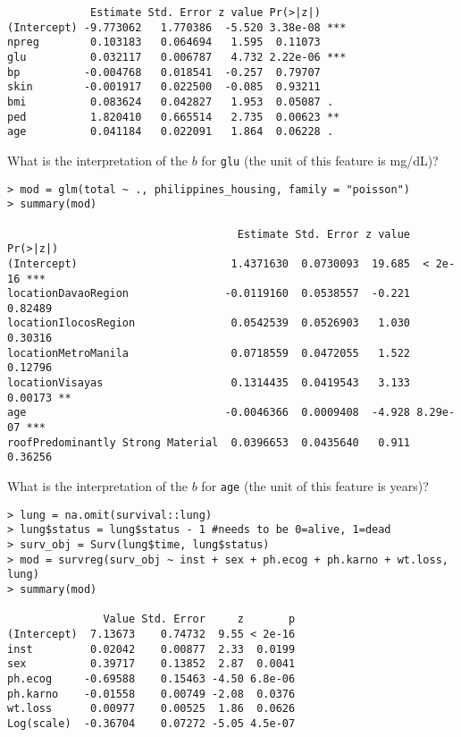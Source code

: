 \documentclass[12pt]{article}
\begin{document}
\begin{enumerate}
\begin{verbatim}
             Estimate Std. Error z value Pr(>|z|)    
(Intercept) -9.773062   1.770386  -5.520 3.38e-08 ***
npreg        0.103183   0.064694   1.595  0.11073    
glu          0.032117   0.006787   4.732 2.22e-06 ***
bp          -0.004768   0.018541  -0.257  0.79707    
skin        -0.001917   0.022500  -0.085  0.93211    
bmi          0.083624   0.042827   1.953  0.05087 .  
ped          1.820410   0.665514   2.735  0.00623 ** 
age          0.041184   0.022091   1.864  0.06228 .  
\end{verbatim}

What is the interpretation of the $b$ for \texttt{glu} (the unit of this feature is mg/dL)?



\vspace{-0.2cm}
\begin{verbatim}
> mod = glm(total ~ ., philippines_housing, family = "poisson")
> summary(mod)

                                    Estimate Std. Error z value Pr(>|z|)    
(Intercept)                        1.4371630  0.0730093  19.685  < 2e-16 ***
locationDavaoRegion               -0.0119160  0.0538557  -0.221  0.82489    
locationIlocosRegion               0.0542539  0.0526903   1.030  0.30316    
locationMetroManila                0.0718559  0.0472055   1.522  0.12796    
locationVisayas                    0.1314435  0.0419543   3.133  0.00173 ** 
age                               -0.0046366  0.0009408  -4.928 8.29e-07 ***
roofPredominantly Strong Material  0.0396653  0.0435640   0.911  0.36256     
\end{verbatim}

What is the interpretation of the $b$ for \texttt{age} (the unit of this feature is years)?



\vspace{-0.2cm}
\begin{verbatim}
> lung = na.omit(survival::lung)
> lung$status = lung$status - 1 #needs to be 0=alive, 1=dead
> surv_obj = Surv(lung$time, lung$status)
> mod = survreg(surv_obj ~ inst + sex + ph.ecog + ph.karno + wt.loss, lung)
> summary(mod)

               Value Std. Error     z       p
(Intercept)  7.13673    0.74732  9.55 < 2e-16
inst         0.02042    0.00877  2.33  0.0199
sex          0.39717    0.13852  2.87  0.0041
ph.ecog     -0.69588    0.15463 -4.50 6.8e-06
ph.karno    -0.01558    0.00749 -2.08  0.0376
wt.loss      0.00977    0.00525  1.86  0.0626
Log(scale)  -0.36704    0.07272 -5.05 4.5e-07
\end{verbatim}


\end{enumerate}
\end{document}
